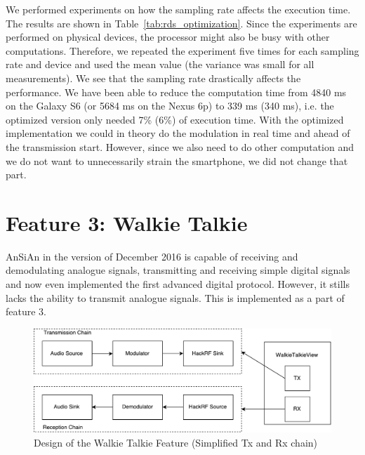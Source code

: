 We performed experiments on how the sampling rate affects the execution time. The results are shown in Table~\ref{tab:rds_optimization}. Since the experiments are performed on physical devices, the processor might also be busy with other computations. Therefore, we repeated the experiment five times for each sampling rate and device and used the mean value (the variance was small for all measurements).  We see that the sampling rate drastically affects the performance. We have been able to reduce the computation time from 4840 ms on the Galaxy S6 (or 5684 ms on the Nexus 6p) to 339 ms (340 ms), i.e. the optimized version only needed 7\% (6\%) of execution time.
With the optimized implementation we could in theory do the modulation in real time and ahead of the transmission start. However, since we also need to do other computation and we do not want to unnecessarily strain the smartphone, we did not change that part. 

\section{Feature 3: Walkie Talkie} 

AnSiAn in the version of December 2016 is capable of receiving and demodulating analogue signals, transmitting and receiving simple digital signals and now even implemented the first advanced digital protocol. However, it stills lacks the ability to transmit analogue signals. This is implemented as a part of feature 3. 
\begin{figure}
	\centering
	\includegraphics[width=1.0\linewidth]{gfx/feature3_concept.pdf}
	\caption{Design of the Walkie Talkie Feature (Simplified Tx and Rx chain)}
	\label{fig:impl:f3concept}
\end{figure}

